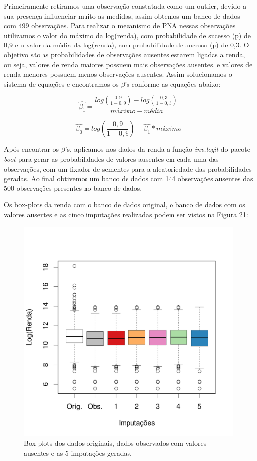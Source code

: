 \documentclass[]{article}
\begin{document}
Primeiramente retiramos uma observação constatada como um outlier,
devido a sua presença influenciar muito as medidas, assim obtemos um
banco de dados com 499 observações. Para realizar o mecanismo de PNA
nessas observações utilizamos o valor do máximo da log(renda), com
probabilidade de sucesso (p) de 0,9 e o valor da média da log(renda),
com probabilidade de sucesso (p) de 0,3. O objetivo são as
probabilidades de observações ausentes estarem ligadas a renda, ou seja,
valores de renda maiores possuem mais observações ausentes, e valores de
renda menores possuem menos observações ausentes. Assim solucionamos o
sistema de equações e encontramos os \(\beta\)'s conforme as equações
abaixo:

\[ \hat{\beta_1} = \frac{log( \frac{0,9}{1-0,9} ) - log( \frac{0,3}{1-0,3} )}{máximo - média} \]

\[ \hat{\beta_0} = log( \frac{0,9}{1-0,9} ) - \hat{\beta_1}*máximo \]

Após encontrar os \(\beta\)'s, aplicamos nos dados da renda a função
\emph{inv.logit} do pacote \emph{boot} para gerar as probabilidades de
valores ausentes em cada uma das observações, com um fixador de sementes
para a aleatoriedade das probabilidades geradas. Ao final obtivemos um
banco de dados com 144 observações ausentes das 500 observações
presentes no banco de dados.

Os box-plots da renda com o banco de dados original, o banco de dados
com os valores ausentes e as cinco imputações realizadas podem ser
vistos na Figura 21:

\begin{figure}[H]

{\centering \includegraphics[width=0.6\linewidth]{p64-graf} 

}

\caption{Box-plots dos dados originais, dados observados com valores ausentes e as 5 imputações geradas.}\label{fig:unnamed-chunk-29}
\end{figure}
\end{document}
